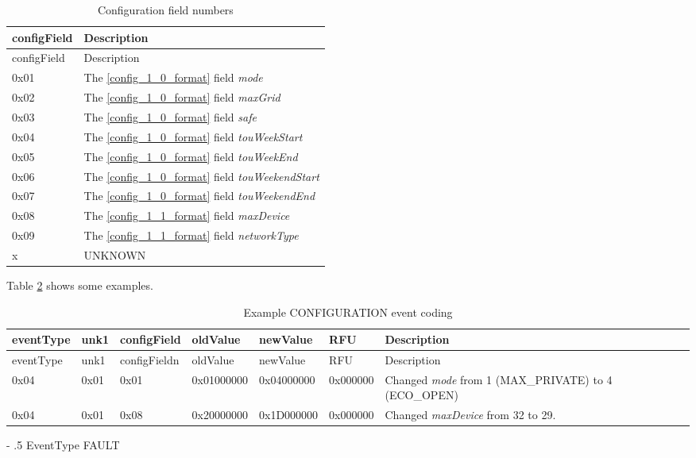 \documentclass[a4paper]{article}
\makeatletter
\renewcommand\subparagraph{%
   \@startsection{subparagraph}{5}{0mm}%
      {-\baselineskip}%
      {.5\baselineskip}%
      {\normalfont\normalsize\itshape}}
\newcommand{\secref}[1]{\ref{#1} \nameref{#1}}
\makeatother
\begin{document}
\begin{longtable}[]{@{}ll@{}}
	\caption{Configuration field numbers}
	\label{table.87}
	\tabularnewline
	\toprule\noalign{}
	configField & Description    \\
	\midrule\noalign{}
	\endfirsthead
	\toprule\noalign{}
	configField & Description    \\
	\midrule\noalign{}
	\endhead
	\bottomrule\noalign{}
	\endlastfoot
	0x01  &  The \secref{config_1_0_format} field \emph{mode} \\
	0x02  &  The \secref{config_1_0_format} field \emph{maxGrid}  \\
	0x03  & The \secref{config_1_0_format} field \emph{safe}  \\
	0x04  & The \secref{config_1_0_format} field \emph{touWeekStart}  \\
	0x05  & The \secref{config_1_0_format} field \emph{touWeekEnd}  \\
	0x06  & The \secref{config_1_0_format} field \emph{touWeekendStart}  \\
	0x07  & The \secref{config_1_0_format} field \emph{touWeekendEnd}  \\
	0x08  & The \secref{config_1_1_format} field \emph{maxDevice}  \\
	0x09  & The \secref{config_1_1_format} field \emph{networkType}  \\
           x & UNKNOWN\\
\end{longtable}

Table \ref{table.91} shows some examples.

\begin{longtable}[]{llllllp{5cm}}
	\caption{Example CONFIGURATION event coding}
	\label{table.91}
	\tabularnewline
	\toprule\noalign{}
	eventType & unk1 & configField & oldValue & newValue    & RFU & Description      \\
	\midrule\noalign{}
	\endfirsthead
	\toprule\noalign{}
	eventType & unk1 & configFieldn & oldValue & newValue    & RFU &  Description      \\
	\midrule\noalign{}
	\endhead
	\bottomrule\noalign{}
	\endlastfoot
	0x04 & 0x01 & 0x01 & 0x01000000 & 0x04000000 & 0x000000 & Changed \emph{mode} from 1 (MAX\_PRIVATE) to 4 (ECO\_OPEN)\\
	0x04 & 0x01 & 0x08 & 0x20000000 & 0x1D000000 & 0x000000 & Changed \emph{maxDevice} from 32 to 29.\\
\end{longtable}


\subparagraph{EventType FAULT}
\label{eventType_FAULT}
\end{document}
